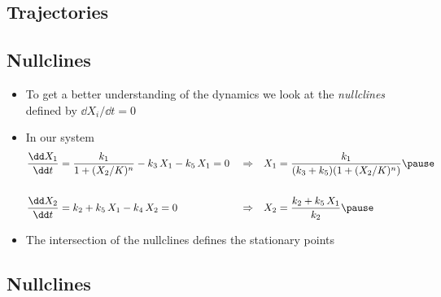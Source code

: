 
\begin{slide}
\section[-2]{Trajectories}

\pause
\pb {}
\begin{center}
  \pause
\end{center}
\end{slide}


\begin{slide}
\section{Nullclines}

\begin{PauseHighLight}
  \begin{itemize}
  \item To get a better understanding of the dynamics we look at the
    \emph{nullclines} defined by $\dd X_i/\dd t=0$\pause
  \item In our system
    {\small \begin{align*}
      \frac{\dd X_1}{\dd t} &= \frac{k_1}{1+(X_2/K)^n} - k_3 \,
                                 X_1- k_5\,X_1 = 0
              & &\Rightarrow &
     X_1 &= \frac{k_1}{(k_3+k_5)(1+(X_2/K)^n)}\pause
              \\ \\
       \frac{\dd X_2}{\dd t} &= k_2 + k_5\,X_1 - k_4\,X_2=0
              &&\Rightarrow &
     X_2 &= \frac{k_2 + k_5\,X_1}{k_2}\pause
            \end{align*}}
   \item The intersection of the nullclines defines the stationary points\pause

  \end{itemize}
\end{PauseHighLight}

\end{slide}



\begin{slide}
\section[-2]{Nullclines}

\pause
\pb {}
\begin{center}
  \pause
\end{center}
\end{slide}

